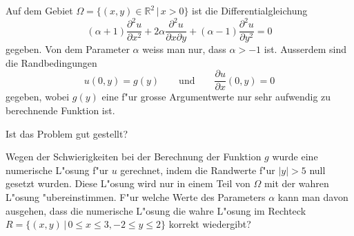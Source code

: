 Auf dem Gebiet $\Omega=\{(x,y)\in\mathbb R^2\,|\, x>0\}$ ist die
Differentialgleichung
\begin{equation}
(\alpha + 1) \frac{\partial^2 u}{\partial x^2}
+
2\alpha\frac{\partial^2 u}{\partial x\partial y}
+
(\alpha - 1)\frac{\partial^2 u}{\partial y^2}
=
0
\label{90000014:dgl}
\end{equation}
gegeben.
Von dem Parameter $\alpha$ weiss man nur, dass $\alpha > -1$ ist.
Ausserdem sind die Randbedingungen
\[
u(0,y)=g(y)\qquad\text{und}\qquad \frac{\partial u}{\partial x}(0,y)=0
\]
gegeben, wobei $g(y)$ eine f"ur grosse Argumentwerte nur sehr aufwendig zu
berechnende Funktion ist.
\begin{teilaufgaben}
\item
Ist das Problem gut gestellt?
\item
Wegen der Schwierigkeiten bei der Berechnung der Funktion $g$
wurde eine numerische L"osung f"ur $u$ gerechnet, indem die
Randwerte f"ur $|y|>5$ null gesetzt wurden.
Diese L"osung wird nur in einem Teil von $\Omega$ mit der wahren L"osung
"ubereinstimmen.
F"ur welche Werte des Parameters $\alpha$ kann man davon ausgehen, dass die
numerische L"osung die wahre L"osung im Rechteck
$R=\{(x,y)\,|\, 0\le x\le 3,-2\le y\le 2\}$ korrekt
wiedergibt?
\end{teilaufgaben}



